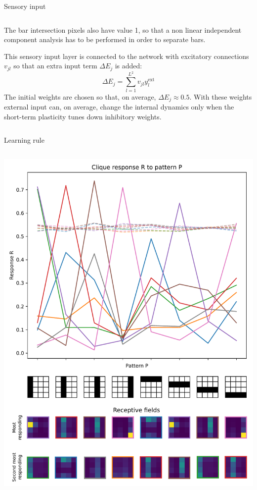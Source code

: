 \documentclass[final,hyperref={pdfpagelabels=false}]{beamer}
\begin{document}
\begin{frame}
\begin{columns}
\begin{column}{.64\textwidth}
\begin{minipage}[T]{.95\textwidth}
{\begin{block}{Sensory input}
\begin{columns}
\begin{column}[T]{.9\textwidth}
								The bar intersection pixels also have value 1, so that a non linear independent component analysis has to be performed in order to separate bars.
								
								This sensory input layer is connected to the network with excitatory connections $v_{jl}$ so that an extra input term $\Delta E_j$ is added:
								\begin{equation*}
									\Delta E_j = \sum_{l=1}^{L^2} v_{jl} y_l^{\text{ext}}
								\end{equation*}
								The initial weights are chosen so that, on average, $\Delta E_j \approx 0.5$. With these weights external input can, on average, change the internal dynamics only when the short-term plasticity tunes down inhibitory weights.
							
							\end{column}
						\end{columns}

							

					\end{block}
						
					\begin{block}{Learning rule}
						\begin{columns}
							\begin{column}[T]{.5\textwidth}
								\includegraphics[width=1\linewidth]{complete2.pdf}	
							\end{column}								
							

\end{columns}
\end{block}}
\end{minipage}
\end{column}
\end{columns}
\end{frame}
\end{document}
